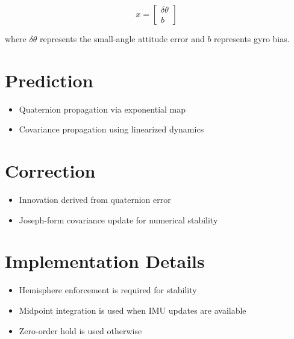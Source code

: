 \[
x =
\begin{bmatrix}
	\delta \theta \\
	b
\end{bmatrix}
\]

where $\delta \theta$ represents the small-angle attitude error and $b$ represents gyro bias.

\section{Prediction}

\begin{itemize}
	\item Quaternion propagation via exponential map
	\item Covariance propagation using linearized dynamics
\end{itemize}

\section{Correction}

\begin{itemize}
	\item Innovation derived from quaternion error
	\item Joseph-form covariance update for numerical stability
\end{itemize}

\section{Implementation Details}

\begin{itemize}
	\item Hemisphere enforcement is required for stability
	\item Midpoint integration is used when IMU updates are available
	\item Zero-order hold is used otherwise
\end{itemize}